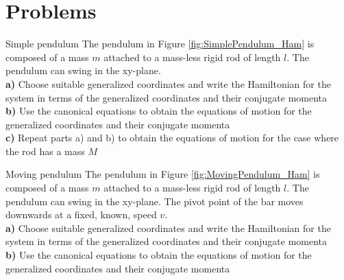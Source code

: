 %
\section{Problems}
\begin{problem}{Simple pendulum}
The pendulum in Figure \ref{fig:SimplePendulum_Ham} is composed of a mass $m$ attached to a mass-less rigid rod of length $l$. The pendulum can swing in the xy-plane. 
\\
\textbf{a)} Choose suitable generalized coordinates and write the Hamiltonian for the system in terms of the generalized coordinates and their conjugate momenta\\
\textbf{b)} Use the canonical equations to obtain the equations of motion for the generalized coordinates and their conjugate momenta\\
\textbf{c)} Repeat parts a) and b) to obtain the equations of motion for the case where the rod has a mass $M$\\
\label{prob_Hamilton_1}
\end{problem}

\begin{problem}{Moving pendulum}
The pendulum in Figure \ref{fig:MovingPendulum_Ham} is composed of a mass $m$ attached to a mass-less rigid rod of length $l$. The pendulum can swing in the xy-plane. The pivot point of the bar moves downwards at a fixed, known, speed $v$.
\\
\textbf{a)} Choose suitable generalized coordinates and write the Hamiltonian for the system in terms of the generalized coordinates and their conjugate momenta\\
\textbf{b)} Use the canonical equations to obtain the equations of motion for the generalized coordinates and their conjugate momenta\\
\label{prob_Hamilton_2}
\end{problem}


